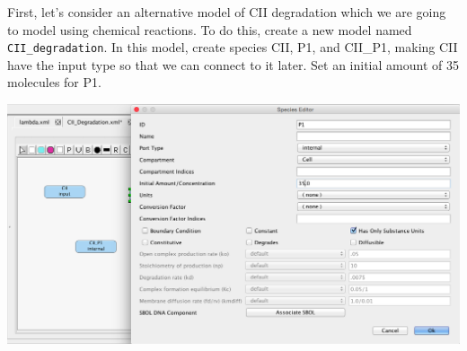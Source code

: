 \documentclass[titlepage,11pt]{article}
\begin{document}
%
%
First, let's consider an alternative model of CII degradation which we are going to model using chemical reactions.  To do this, create a new model named {\tt CII\_degradation}.  In this model, create species CII, P1, and CII\_P1, making CII have the input type so that we can connect to it later.  Set an initial amount of 35 molecules for P1.

\begin{center}
\includegraphics[width=160mm]{screenshots/P1}
\end{center}
\end{document}
